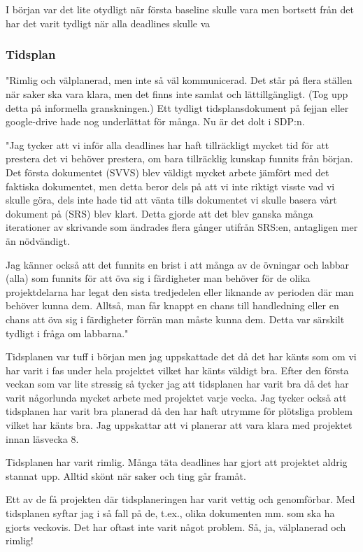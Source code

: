 \documentclass[a4paper]{article}
\begin{document}
I början var det lite otydligt när första baseline skulle vara men bortsett från det har det varit tydligt när alla deadlines skulle va

\subsubsection{Tidsplan}
"Rimlig och välplanerad, men inte så väl kommunicerad. Det står på flera ställen när saker ska vara klara, men det finns inte samlat och lättillgängligt. (Tog upp detta på informella granskningen.)
Ett tydligt tidsplansdokument på fejjan eller google-drive hade nog underlättat för många. Nu är det dolt i SDP:n.

"Jag tycker att vi inför alla deadlines har haft tillräckligt mycket tid för att prestera det vi behöver prestera, om bara tillräcklig kunskap funnits från början. Det första dokumentet (SVVS) blev väldigt mycket arbete jämfört med det faktiska dokumentet, men detta beror dels på att vi inte riktigt visste vad vi skulle göra, dels inte hade tid att vänta tills dokumentet vi skulle basera vårt dokument på (SRS) blev klart. Detta gjorde att det blev ganska många iterationer av skrivande som ändrades flera gånger utifrån SRS:en, antagligen mer än nödvändigt.

Jag känner också att det funnits en brist i att många av de övningar och labbar (alla) som funnits för att öva sig i färdigheter man behöver för de olika projektdelarna har legat den sista tredjedelen eller liknande av perioden där man behöver kunna dem. Alltså, man får knappt en chans till handledning eller en chans att öva sig i färdigheter förrän man måste kunna dem. Detta var särskilt tydligt i fråga om labbarna."

Tidsplanen var tuff i början men jag uppskattade det då det har känts som om vi har varit i fas under hela projektet vilket har känts väldigt bra. Efter den första veckan som var lite stressig så tycker jag att tidsplanen har varit bra då det har varit någorlunda mycket arbete med projektet varje vecka. Jag tycker också att tidsplanen har varit bra planerad då den har haft utrymme för plötsliga problem vilket har känts bra. Jag uppskattar att vi planerar att vara klara med projektet innan läsvecka 8. 

Tidsplanen har varit rimlig. Många täta deadlines har gjort att projektet aldrig stannat upp. Alltid skönt när saker och ting går framåt. 

Ett av de få projekten där tidsplaneringen har varit vettig och genomförbar. Med tidsplanen syftar jag i så fall på de, t.ex., olika dokumenten mm. som ska ha gjorts veckovis. Det har oftast inte varit något problem. Så, ja, välplanerad och rimlig! 
\end{document}

